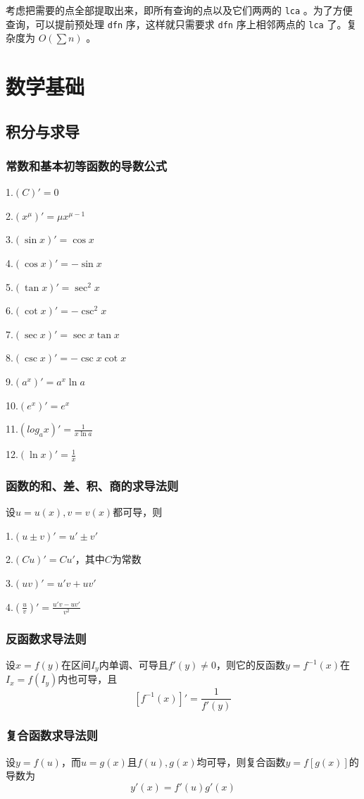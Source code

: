 \documentclass[UTF-8]{ctexart}
\begin{document}
	考虑把需要的点全部提取出来，即所有查询的点以及它们两两的 \texttt{lca} 。为了方便查询，可以提前预处理 \texttt{dfn} 序，这样就只需要求 \texttt{dfn} 序上相邻两点的 \texttt{lca} 了。复杂度为 $O(\sum n)$ 。
	\newpage
	\section{数学基础}
	\subsection{积分与求导}
	\subsubsection{常数和基本初等函数的导数公式}
	1.$(C)'=0$  
	
	2.$(x^\mu)'=\mu x^{\mu-1}$  
	
	3.$(\sin x)'=\cos x$  
	
	4.$(\cos x)'=-\sin x$  
	
	5.$(\tan x)'=\sec^2 x$  
	
	6.$(\cot x)'=-\csc^2 x$  
	
	7.$(\sec x)'=\sec x \tan x$  
	
	8.$(\csc x)'=-\csc x\cot x$  
	
	9.$(a^x)'=a^x \ln a$  
	
	10.$(e^x)'=e^x$  
	
	11.$(log _ a x)'=\frac{1}{x \ln a}$  
	
	12.$(\ln x)'=\frac{1}{x}$  
	\subsubsection{函数的和、差、积、商的求导法则}
	
	设$u=u(x),v=v(x)$都可导，则  
	
	1.$(u \pm v)'=u' \pm v'$  
	
	2.$(Cu)'=Cu'$，其中$C$为常数  
	
	3.$(uv)'=u'v+uv'$  
	
	4.$(\frac{u}{v})'=\frac{u'v-uv'}{v^2}$
	
	\subsubsection{反函数求导法则}
	设$x=f(y)$在区间$I _ y$内单调、可导且$f'(y)\ne 0$，则它的反函数$y=f^{-1}(x)$在$I _ x=f(I _ y)$内也可导，且  
	$$[f^{-1}(x)]'=\frac{1}{f'(y)}$$
	
	\subsubsection{复合函数求导法则}
	设$y=f(u)$，而$u=g(x)$且$f(u),g(x)$均可导，则复合函数$y=f[g(x)]$的导数为  
	$$y'(x)=f'(u) g'(x)$$
\end{document}
